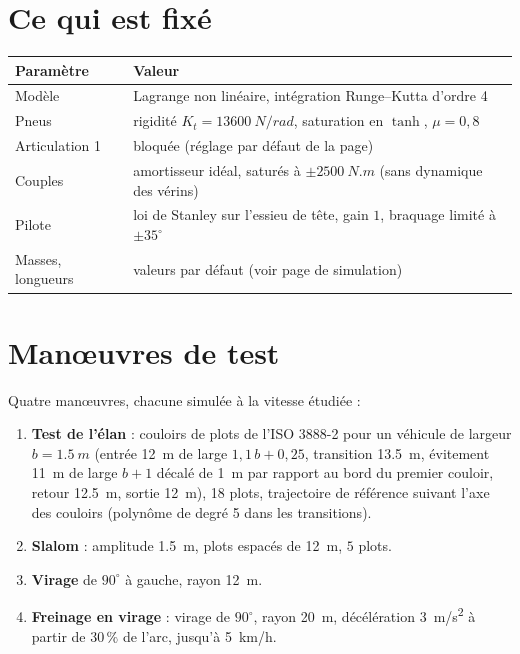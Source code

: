 \documentclass[a4paper,11pt]{article}
\begin{document}
\section{Ce qui est fixé}
\begin{center}\small
\begin{tabular}{@{}ll@{}}\toprule
Paramètre & Valeur\\\midrule
Modèle & Lagrange non linéaire, intégration Runge--Kutta d'ordre 4\\
Pneus & rigidité $K_t=\SI{13600}{N/rad}$, saturation en $\tanh$, $\mu=0{,}8$\\
Articulation 1 & bloquée (réglage par défaut de la page)\\
Couples & amortisseur idéal, saturés à $\pm\SI{2500}{N.m}$ (sans dynamique des vérins)\\
Pilote & loi de Stanley sur l'essieu de tête, gain $1$, braquage limité à $\pm35^\circ$\\
Masses, longueurs & valeurs par défaut (voir page de simulation)\\\bottomrule
\end{tabular}
\end{center}

\section{Manœuvres de test}
Quatre manœuvres, chacune simulée à la vitesse étudiée :
\begin{enumerate}
  \item \textbf{Test de l'élan} : couloirs de plots de l'ISO 3888-2 pour un véhicule de largeur $b=\SI{1,5}{m}$ (entrée \SI{12}{m} de large $1{,}1\,b+0{,}25$, transition \SI{13,5}{m}, évitement \SI{11}{m} de large $b+1$ décalé de \SI{1}{m} par rapport au bord du premier couloir, retour \SI{12,5}{m}, sortie \SI{12}{m}), 18 plots, trajectoire de référence suivant l'axe des couloirs (polynôme de degré 5 dans les transitions).
  \item \textbf{Slalom} : amplitude \SI{1,5}{m}, plots espacés de \SI{12}{m}, $5$ plots.
  \item \textbf{Virage} de $90^\circ$ à gauche, rayon \SI{12}{m}.
  \item \textbf{Freinage en virage} : virage de $90^\circ$, rayon \SI{20}{m}, décélération \SI{3}{m/s^2} à partir de $30\,\%$ de l'arc, jusqu'à \SI{5}{km/h}.
\end{enumerate}
\end{document}
